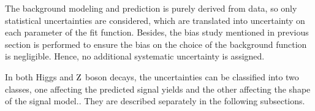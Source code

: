 		The background modeling and prediction is purely derived from data, so only statistical uncertainties are considered, which are translated into uncertainty on each parameter of the fit function. Besides, the bias study mentioned in previous section is performed to ensure the bias on the choice of the background function is negligible. Hence, no additional systematic uncertainty is assigned.
		
		
		In both Higgs and $\mathrm{Z}$ boson decays, the uncertainties can be classified into two classes, one affecting the predicted signal yields and the other affecting the shape of the signal model.. They are described separately in the following subsections.
